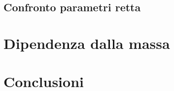 \documentclass{article}
\begin{document}
\subsection{Confronto parametri retta}






\newpage
\section{Dipendenza dalla massa}









\newpage
\section{Conclusioni}
\end{document}

